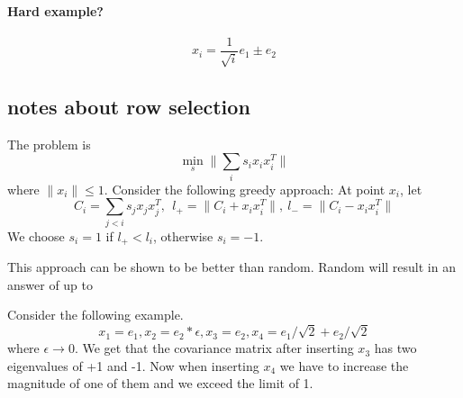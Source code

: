 \documentclass{article} %
\newcommand{\eps}{\epsilon}
\begin{document}
\paragraph{Hard example?}
$$x_i = \frac{1}{\sqrt{i}} e_1 \pm e_2 $$


\subsection{notes about row selection}
The problem is 
$$ \min_s \| \sum_i s_i x_ix_i^T\| $$
where $\|x_i\| \leq 1$. Consider the following greedy approach: At point $x_i$, let
$$ C_i = \sum_{j<i} s_j x_j x_j^T, \ \  l_+ = \|C_i + x_i x_i^T \|, \ l_- = \|C_i - x_i x_i^T\|$$
We choose $s_i = 1$ if $l_+ < l_i$, otherwise $s_i=-1$.

This approach can be shown to be better than random. Random will result in an answer of up to 

Consider the following example. 
$$x_1=e_1, x_2=e_2*\eps, x_3=e_2, x_4=e_1/\sqrt{2} + e_2/\sqrt{2}$$
where $\eps \to 0$. We get that the covariance matrix after inserting $x_3$ has two eigenvalues of +1 and -1. Now when inserting $x_4$ we have to increase the magnitude of one of them and we exceed the limit of 1. 



\end{document}
